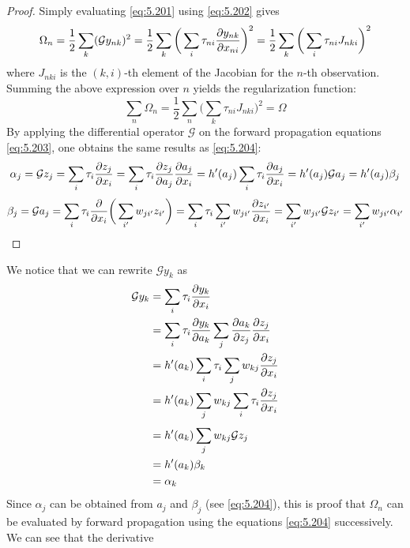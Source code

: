 \vspace{1em}

\begin{proof}
    Simply evaluating \eqref{eq:5.201} using \eqref{eq:5.202} gives
    \[
        \Omega_n 
        = \frac{1}{2}\sum_{k}(\mathcal{G} y_{nk})^2
        = \frac{1}{2}\sum_{k}\bigg(\sum_{i} \tau_{ni} \pdv{y_{nk}}{x_{ni}}\bigg)^2
        = \frac{1}{2}\sum_{k}\bigg(\sum_{i} \tau_{ni} J_{nki}\bigg)^2
    \] 
    where 
    $J_{nki}$ is the $(k, i)$-th element of the Jacobian for the $n$-th observation.
    Summing the above expression over $n$ yields the regularization function:
    \begin{equation*}
        \sum_{n} \Omega_n = \frac{1}{2} \sum_{n} \bigg(\sum_{k} \tau_{ni} J_{nki}\bigg)^2 = \Omega
        \tag{5.128}\label{eq:5.128}
    \end{equation*}
    By applying the differential operator $\mathcal{G}$ on the forward propagation equations
    \eqref{eq:5.203}, one obtains the same results as \eqref{eq:5.204}:
    \[
        \alpha_j 
        = \mathcal{G}z_j 
        = \sum_{i} \tau_i \pdv{z_j}{x_i}
        = \sum_{i} \tau_i \pdv{z_j}{a_j} \pdv{a_j}{x_i}
        = h'(a_j) \sum_{i} \tau_i \pdv{a_j}{x_i}
        = h'(a_j) \mathcal{G} a_j
        = h'(a_j) \beta_j
    \] 
    \[
        \beta_j
        = \mathcal{G}a_j
        = \sum_{i} \tau_i \pdv{x_i}\bigg(\sum_{i'} w_{ji'} z_{i'}\bigg)
        = \sum_{i} \tau_i \sum_{i'} w_{ji'} \pdv{z_{i'}}{x_i}
        = \sum_{i'} w_{ji'} \mathcal{G} z_{i'}
        = \sum_{i'} w_{ji'} \alpha_{i'}
    \] 
\end{proof}
We notice that we can rewrite $\mathcal{G} y_{k}$ as
\begin{align*}
    \mathcal{G}y_k 
    &= \sum_{i}^{} \tau_i \pdv{y_k}{x_i} \\
    &= \sum_{i}^{} \tau_i \pdv{y_k}{a_k} \sum_{j} \pdv{a_k}{z_j} \pdv{z_j}{x_i} \\
    &= h'(a_k) \sum_{i}^{} \tau_i \sum_{j}^{} w_{kj} \pdv{z_j}{x_i} \\
    &= h'(a_k) \sum_{j}^{} w_{kj} \sum_{i}^{} \tau_i \pdv{z_j}{x_i} \\
    &= h'(a_k) \sum_{j}^{} w_{kj} \mathcal{G} z_j \\
    &= h'(a_k) \beta_k \\
    &= \alpha_k
\end{align*}
Since $\alpha_j$ can be obtained from $a_j$ and $\beta_j$ (see \eqref{eq:5.204}),
this is proof that $\Omega_n$ can be evaluated by forward propagation using the 
equations \eqref{eq:5.204} successively. We can see that the derivative
